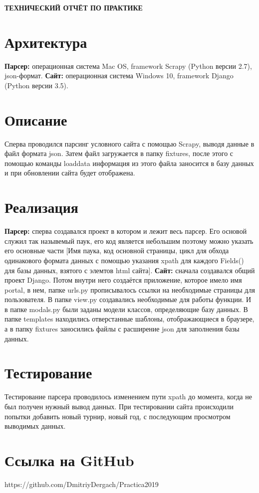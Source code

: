 \begin{center}
\bfseries{\large ТЕХНИЧЕСКИЙ ОТЧЁТ ПО ПРАКТИКЕ}
\end{center}

\section*{Архитектура}
\textbf{Парсер:} операционная система Mac OS, framework Scrapy (Python версии 2.7), json-формат.
\textbf{Сайт:} операционная система Windows 10, framework Django (Python версии 3.5).
\section*{Описание}
Сперва проводился парсинг условного сайта с помощью Scrapy, выводя данные в файл формата json. Затем файл загружается в папку fixtures, после этого с помощью команды loaddata информация из этого файла заносится в базу данных и при обновлении сайта будет отображена.
\section*{Реализация}
\textbf{Парсер:} сперва создавался проект в котором и лежит весь парсер. Его основой служил так назывемый паук, его код является небольшим поэтому можно указать его основные части [Имя паука, код основной страницы, цикл для обхода одинакового формата данных с помощью указания xpath для каждого Fields() для базы данных, взятого с элемтов html сайта]. \textbf{Сайт:} сначала создавался общий проект Django. Потом внутри него создаётся приложение, которое имело имя portal, в нем, папке urls.py прописывалось ссылки на необходимые страницы для пользователя. В папке view.py создавались необходимые для работы функции. И в папке modals.py были заданы модели классов, определяющие базу данных. В папке templates находились отверстанные шаблоны, отображающиеся в браузере, а в папку fixtures заносились файлы с расширение json для заполнения базы данных.
\section*{Тестирование}
Тестирование парсера проводилось изменением пути xpath до момента, когда не был получен нужный вывод данных. При тестировании сайта происходили попытки добавить новый турнир, новый год, с последующим просмотром выводимых данных.
\section*{Ссылка на GitHub}
https://github.com/DmitriyDergach/Practica2019
\pagebreak
